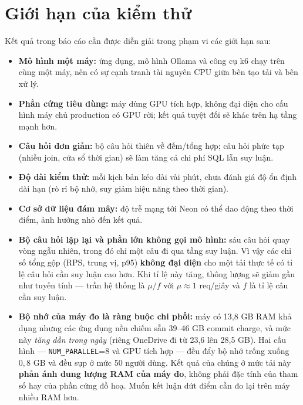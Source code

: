 \documentclass[12pt,a4paper]{article}
\begin{document}
\section{Giới hạn của kiểm thử}

Kết quả trong báo cáo cần được diễn giải trong phạm vi các giới hạn sau:

\begin{itemize}
  \item \textbf{Mô hình một máy:} ứng dụng, mô hình Ollama và công cụ k6 chạy trên
  cùng một máy, nên có sự cạnh tranh tài nguyên CPU giữa bên tạo tải và bên xử lý.
  \item \textbf{Phần cứng tiêu dùng:} máy dùng GPU tích hợp, không đại diện cho cấu
  hình máy chủ production có GPU rời; kết quả tuyệt đối sẽ khác trên hạ tầng mạnh hơn.
  \item \textbf{Câu hỏi đơn giản:} bộ câu hỏi thiên về đếm/tổng hợp; câu hỏi phức
  tạp (nhiều join, cửa sổ thời gian) sẽ làm tăng cả chi phí SQL lẫn suy luận.
  \item \textbf{Độ dài kiểm thử:} mỗi kịch bản kéo dài vài phút, chưa đánh giá độ ổn
  định dài hạn (rò rỉ bộ nhớ, suy giảm hiệu năng theo thời gian).
  \item \textbf{Cơ sở dữ liệu đám mây:} độ trễ mạng tới Neon có thể dao động theo
  thời điểm, ảnh hưởng nhỏ đến kết quả.
  \item \textbf{Bộ câu hỏi lặp lại và phần lớn không gọi mô hình:} sáu câu hỏi
  quay vòng ngẫu nhiên, trong đó chỉ một câu đi qua tầng suy luận. Vì vậy các chỉ
  số tổng gộp (RPS, trung vị, p95) \textbf{không đại diện} cho một tải thực tế có
  tỉ lệ câu hỏi cần suy luận cao hơn. Khi tỉ lệ này tăng, thông lượng sẽ giảm gần
  như tuyến tính --- trần hệ thống là $\mu/f$ với $\mu \approx 1$ req/giây và $f$
  là tỉ lệ câu cần suy luận.
  \item \textbf{Bộ nhớ của máy đo là ràng buộc chi phối:} máy có 13,8 GB RAM khả
  dụng nhưng các ứng dụng nền chiếm sẵn 39--46 GB commit charge, và mức này
  \emph{tăng dần trong ngày} (riêng OneDrive đi từ 23,6 lên 28,5 GB). Hai cấu
  hình --- \texttt{NUM\_PARALLEL}=8 và GPU tích hợp --- đều đẩy bộ nhớ trống
  xuống $0{,}8$ GB và đều sụp ở mức 50 người dùng. Kết quả của chúng ở mức tải
  này \textbf{phản ánh dung lượng RAM của máy đo}, không phải đặc tính của tham
  số hay của phần cứng đồ hoạ. Muốn kết luận dứt điểm cần đo lại trên máy nhiều
  RAM hơn.
\end{itemize}
\end{document}

